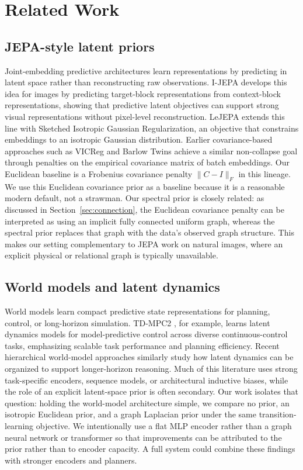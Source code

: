 \section{Related Work}\label{sec:related}

\subsection{JEPA-style latent priors}

Joint-embedding predictive architectures learn representations by predicting in latent space rather than reconstructing raw observations. I-JEPA \cite{ijepa} develops this idea for images by predicting target-block representations from context-block representations, showing that predictive latent objectives can support strong visual representations without pixel-level reconstruction. LeJEPA \cite{lejepa} extends this line with Sketched Isotropic Gaussian Regularization, an objective that constrains embeddings to an isotropic Gaussian distribution. Earlier covariance-based approaches such as VICReg \cite{vicreg} and Barlow Twins \cite{barlowtwins} achieve a similar non-collapse goal through penalties on the empirical covariance matrix of batch embeddings. Our Euclidean baseline is a Frobenius covariance penalty \(\|C-I\|_F\) in this lineage. We use this Euclidean covariance prior as a baseline because it is a reasonable modern default, not a strawman. Our spectral prior is closely related: as discussed in Section~\ref{sec:connection}, the Euclidean covariance penalty can be interpreted as using an implicit fully connected uniform graph, whereas the spectral prior replaces that graph with the data's observed graph structure. This makes our setting complementary to JEPA work on natural images, where an explicit physical or relational graph is typically unavailable.

\subsection{World models and latent dynamics}

World models learn compact predictive state representations for planning, control, or long-horizon simulation. TD-MPC2 \cite{tdmpc2}, for example, learns latent dynamics models for model-predictive control across diverse continuous-control tasks, emphasizing scalable task performance and planning efficiency. Recent hierarchical world-model approaches \cite{hwm} similarly study how latent dynamics can be organized to support longer-horizon reasoning. Much of this literature uses strong task-specific encoders, sequence models, or architectural inductive biases, while the role of an explicit latent-space prior is often secondary. Our work isolates that question: holding the world-model architecture simple, we compare no prior, an isotropic Euclidean prior, and a graph Laplacian prior under the same transition-learning objective. We intentionally use a flat MLP encoder rather than a graph neural network or transformer so that improvements can be attributed to the prior rather than to encoder capacity. A full system could combine these findings with stronger encoders and planners.

